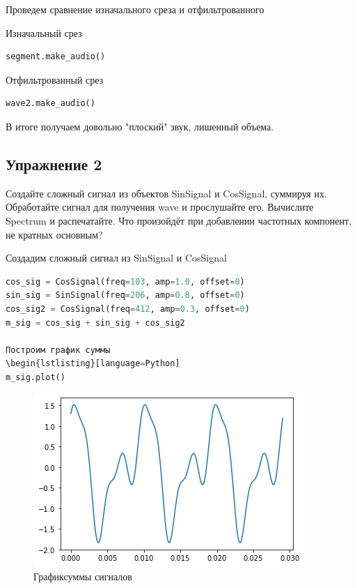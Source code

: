 Проведем сравнение изначального среза и отфильтрованного

Изначальный срез
\begin{lstlisting}[language=Python]
segment.make_audio()
\end{lstlisting}

Отфильтрованный срез
\begin{lstlisting}[language=Python]
wave2.make_audio()
\end{lstlisting}

В итоге получаем довольно "плоский" звук, лишенный объема.


\subsection{Упражнение 2}

Создайте сложный сигнал из объектов SinSignal и CosSignal, суммируя их. Обработайте сигнал для получения wave и прослушайте его. Вычислите Spectrum и распечатайте. Что произойдёт при добавлении частотных компонент, не кратных основным?

Создадим сложный сигнал из SinSignal и CosSignal
\begin{lstlisting}[language=Python]
cos_sig = CosSignal(freq=103, amp=1.0, offset=0)
sin_sig = SinSignal(freq=206, amp=0.8, offset=0)
cos_sig2 = CosSignal(freq=412, amp=0.3, offset=0)
m_sig = cos_sig + sin_sig + cos_sig2

Построим график суммы
\begin{lstlisting}[language=Python]
m_sig.plot()

\end{lstlisting}
\begin{figure}[H]
	\begin{center}
		\includegraphics[scale=1]{fig/lab01/lab01_08.png}
		\caption{Графиксуммы сигналов}
	\end{center}
\end{figure}

